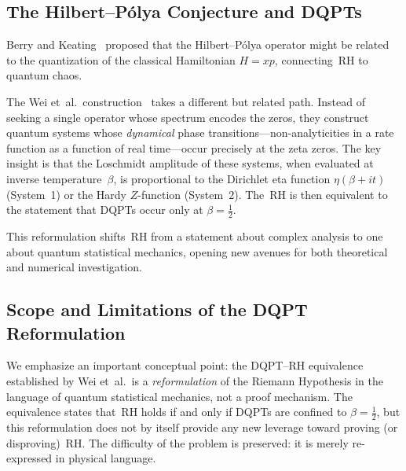 \subsection{The Hilbert--P\'olya Conjecture and DQPTs}
\label{sec:hilbert-polya}

Berry and Keating~\cite{berrykeating1999} proposed that the Hilbert--P\'olya operator
might be related to the quantization of the classical Hamiltonian $H = xp$, connecting~RH
to quantum chaos.

The Wei et~al.\ construction~\cite{wei2025} takes a different but related path. Instead
of seeking a single operator whose spectrum encodes the zeros, they construct quantum
systems whose \emph{dynamical} phase transitions---non-analyticities in a rate function
as a function of real time---occur precisely at the zeta zeros. The key insight is that
the Loschmidt amplitude of these systems, when evaluated at inverse temperature~$\beta$,
is proportional to the Dirichlet eta function $\eta(\beta + it)$ (System~1) or the
Hardy $Z$-function (System~2). The~RH is then equivalent to the statement that DQPTs
occur only at $\beta = \tfrac{1}{2}$.

This reformulation shifts~RH from a statement about complex analysis to one about
quantum statistical mechanics, opening new avenues for both theoretical and numerical
investigation.

\subsection{Scope and Limitations of the DQPT Reformulation}
\label{sec:scope}

We emphasize an important conceptual point: the DQPT--RH equivalence established by
Wei et~al.\ is a \emph{reformulation} of the Riemann Hypothesis in the language of
quantum statistical mechanics, not a proof mechanism. The equivalence states that~RH
holds if and only if DQPTs are confined to $\beta = \tfrac{1}{2}$, but this
reformulation does not by itself provide any new leverage toward proving (or
disproving)~RH. The difficulty of the problem is preserved: it is merely re-expressed
in physical language.

